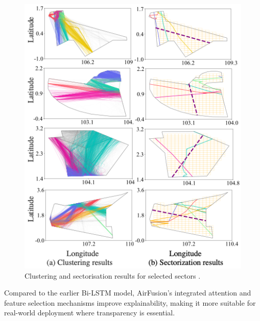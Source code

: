 \begin{figure}[!ht]
    \centering
    \includegraphics[width=.5\textwidth]{img/airspace-tft.png}
    \caption{Clustering and sectorisation results for selected sectors \cite{Zhou_2023}.}
    \label{airspace-tft}
\end{figure}


Compared to the earlier \gls{Bi-LSTM} model, AirFusion's integrated attention and feature selection mechanisms improve explainability, making it more suitable for real-world deployment where transparency is essential.

